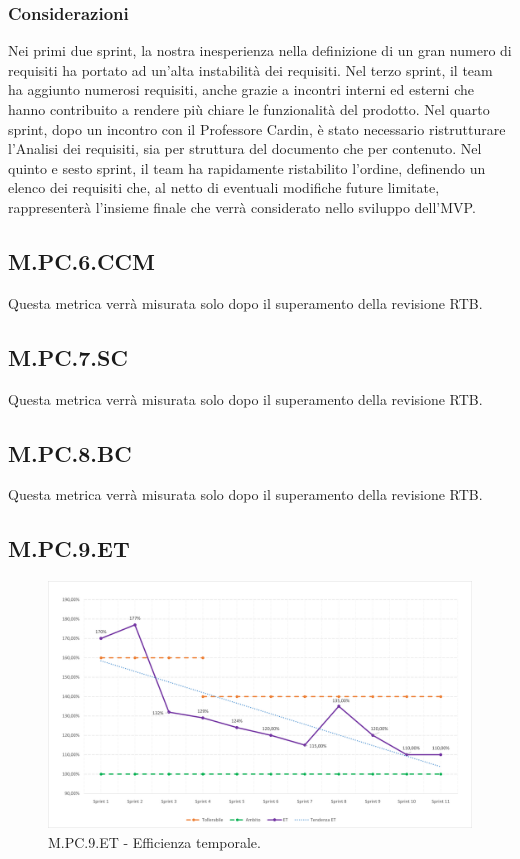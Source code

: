 \documentclass[10pt, a4paper]{article}
\begin{document}
\subsubsection{Considerazioni}
Nei primi due sprint, la nostra inesperienza nella definizione di un gran numero di requisiti ha portato ad un'alta instabilità dei requisiti.
Nel terzo sprint, il team ha aggiunto numerosi requisiti, anche grazie a incontri interni ed esterni che hanno contribuito a rendere più chiare le funzionalità del prodotto.
Nel quarto sprint, dopo un incontro con il Professore Cardin, è stato necessario ristrutturare l'Analisi dei requisiti, sia per struttura del documento che per contenuto.
Nel quinto e sesto sprint, il team ha rapidamente ristabilito l'ordine, definendo un elenco dei requisiti che, al netto di eventuali modifiche future limitate, rappresenterà l'insieme finale che verrà considerato nello sviluppo dell'MVP.
\subsection{M.PC.6.CCM}
Questa metrica verrà misurata solo dopo il superamento della revisione RTB.
\subsection{M.PC.7.SC}
Questa metrica verrà misurata solo dopo il superamento della revisione RTB.
\subsection{M.PC.8.BC}
Questa metrica verrà misurata solo dopo il superamento della revisione RTB.
\subsection{M.PC.9.ET}
\begin{figure}[H]
\includegraphics[width=15.5cm]{img/metriche/MPC9ET.png}
\caption{M.PC.9.ET - Efficienza temporale.}
\end{figure}
\end{document}
